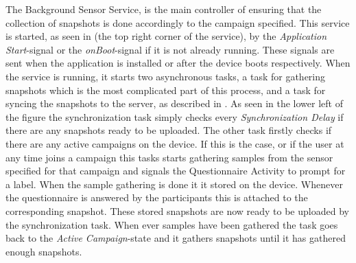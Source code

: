 The Background Sensor Service, is the main controller of ensuring that the collection of snapshots is done accordingly to the campaign specified. This service is started, as seen in  (the top right corner of the service), by the \emph{Application Start}-signal or the \emph{onBoot}-signal if it is not already running. These signals are sent when the application is installed or after the device boots respectively. When the service is running, it starts two asynchronous tasks, a task for gathering snapshots which is the most complicated part of this process, and a task for syncing the snapshots to the server, as described in . As seen in the lower left of the figure the synchronization task simply checks every \emph{Synchronization Delay} if there are any snapshots ready to be uploaded. The other task firstly checks if there are any active campaigns on the device. If this is the case, or if the user at any time joins a campaign this tasks starts gathering samples from the sensor specified for that campaign and signals the Questionnaire Activity to prompt for a label. When the sample gathering is done it it stored on the device. Whenever the questionnaire is answered by the participants this is attached to the corresponding snapshot. These stored snapshots are now ready to be uploaded by the synchronization task. When ever samples have been gathered the task goes back to the \emph{Active Campaign}-state and it gathers snapshots until it has gathered enough snapshots.

